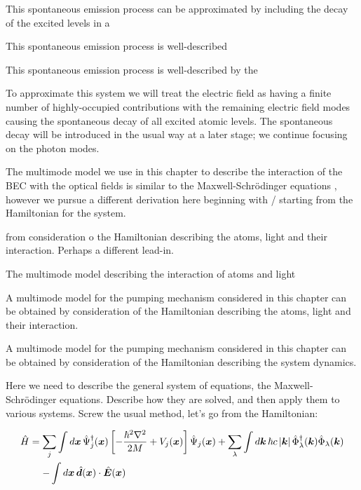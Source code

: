 This spontaneous emission process can be approximated by including the decay of the excited levels in a 

This spontaneous emission process is well-described


This spontaneous emission process is well-described by the 



To approximate this system we will treat the electric field as having a finite number of highly-occupied contributions with the remaining electric field modes causing the spontaneous decay of all excited atomic levels.  The spontaneous decay will be introduced in the usual way at a later stage; we continue focusing on the photon modes.



The multimode model we use in this chapter to describe the interaction of the BEC with the optical fields is similar to the Maxwell-Schrödinger equations \citep{Zobay:2005,Zobay:2006}, however we pursue a different derivation here beginning with / starting from the Hamiltonian for the system.


from consideration o the Hamiltonian describing the atoms, light and their interaction.  Perhaps a different lead-in.

The multimode model describing the interaction of atoms and light 


A multimode model for the pumping mechanism considered in this chapter can be obtained by consideration of the Hamiltonian describing the atoms, light and their interaction.




A multimode model for the pumping mechanism considered in this chapter can be obtained by consideration of the Hamiltonian describing the system dynamics.  



Here we need to describe the general system of equations, the Maxwell-Schrödinger equations.  Describe how they are solved, and then apply them to various systems. Screw the usual method, let's go from the Hamiltonian:

\begin{align}
    \begin{split}
        \hat{H} &= \sum_j \int d \bm{x}\, \hat{\Psi}_j^\dagger(\bm{x}) \left[ - \frac{\hbar^2 \nabla^2}{2 M} + V_j(\bm{x}) \right] \hat{\Psi}_j(\bm{x}) + \sum_\lambda \int d \bm{k}\, \hbar c \abs{\bm{k}} \hat{\Phi}_\lambda^\dagger(\bm{k}) \hat{\Phi}_\lambda(\bm{k}) \\
        &\relphantom{=}- \int d \bm{x}\, \hat{\bm{d}}(\bm{x}) \cdot \hat{\bm{E}}(\bm{x})
    \end{split}
\end{align}

